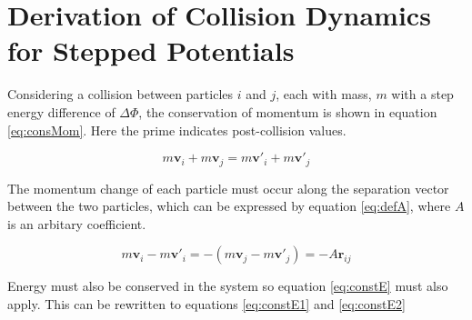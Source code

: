 \documentclass[12pt]{UoAthesis}
\begin{document}


\newpage\printbibliography[heading=thesisChapterBib] 

\appendix
\chapter{Derivation of Collision Dynamics for Stepped Potentials }
\label{app:derivation}
Considering a collision between particles $i$ and $j$, each with mass,
$m$ with a step energy difference of $\Delta \Phi$, the conservation of
momentum is shown in equation \eqref{eq:consMom}. Here the prime
indicates post-collision values.

\begin{equation}
\label{eq:consMom}
m\mathbf{v}_i + m\mathbf{v}_j = m\mathbf{v}'_i + m\mathbf{v}'_j
\end{equation}

The momentum change of each particle must occur along the separation
vector between the two particles, which can be expressed by equation
\eqref{eq:defA}, where $A$ is an arbitary coefficient.

\begin{equation}
  \label{eq:defA}
  m\mathbf{v}_i - m\mathbf{v}'_i = -(m\mathbf{v}_j - m\mathbf{v}'_j) 
  = -A\mathbf{\hat{r}}_{ij}
\end{equation}

Energy must also be conserved in the system so equation
\eqref{eq:constE} must also apply.  This can be rewritten to equations
\eqref{eq:constE1} and \eqref{eq:constE2}
\end{document}
